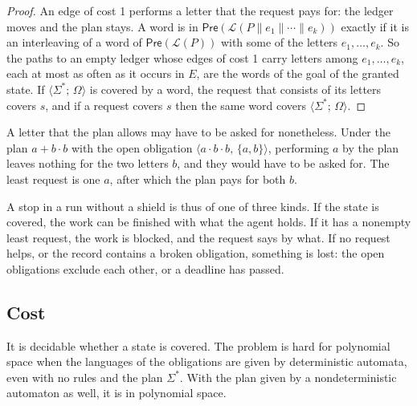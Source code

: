 \documentclass[acmsmall,nonacm,screen]{acmart}
\newcommand{\kw}[1]{\mathsf{#1}}
\newcommand{\ob}[2]{\langle #1,\, #2 \rangle}
\newcommand{\st}[2]{\langle #1;\, #2 \rangle}
\newcommand{\lang}[1]{\mathcal{L}(#1)}
\newcommand{\pre}[1]{\kw{Pre}(#1)}
\newcommand{\sh}{\mathbin{\parallel}}
\newcommand{\claim}[2]{#2}
\begin{document}
\begin{proof}
An edge of cost 1 performs a letter that the request pays for: the ledger moves and the plan
stays. A word is in $\pre{\lang{P \sh e_1 \sh \cdots \sh e_k}}$ exactly if it is an
interleaving of a word of $\pre{\lang{P}}$ with some of the letters $e_1, \ldots, e_k$. So
the paths to an empty ledger whose edges of cost 1 carry letters among $e_1, \ldots, e_k$,
each at most as often as it occurs in $E$, are the words of the goal of the granted state.
If $\st{\Sigma^{*}}{\Omega}$ is covered by a word, the request that consists of its letters
covers $s$, and if a request covers $s$ then the same word covers
$\st{\Sigma^{*}}{\Omega}$.
\end{proof}

A letter that the plan allows may have to be asked for nonetheless.
\claim{ask-example}{Under the plan $a + b \cdot b$ with the open obligation
$\ob{a \cdot b \cdot b}{\{a, b\}}$, performing $a$ by the plan leaves nothing for the two
letters $b$, and they would have to be asked for. The least request is one $a$, after which
the plan pays for both $b$.}

A stop in a run without a shield is thus of one of three kinds. If the state is covered, the
work can be finished with what the agent holds. If it has a nonempty least request, the work
is blocked, and the request says by what. If no request helps, or the record contains a
broken obligation, something is lost: the open obligations exclude each other, or a
deadline has passed.

\subsection{Cost}

\begin{proposition}
\label{prop:cost}
It is decidable whether a state is covered. The problem is hard for polynomial space when
the languages of the obligations are given by deterministic automata, even with no rules and the plan
$\Sigma^{*}$. With the plan given by a nondeterministic automaton as well, it is in
polynomial space.
\end{proposition}
\end{document}

